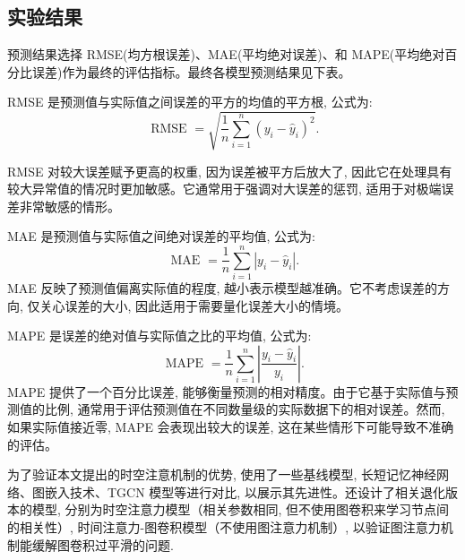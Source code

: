 \subsection{实验结果}


预测结果选择 RMSE(均方根误差)、MAE(平均绝对误差)、和 MAPE(平均绝对百分比误差)作为最终的评估指标。最终各模型预测结果见下表。

RMSE 是预测值与实际值之间误差的平方的均值的平方根, 公式为:
\begin{equation}
\text{ RMSE } = \sqrt{\frac{1}{{n}}\mathop{\sum }\limits_{{{i} = 1}}^{{n}}{\left( {{y}}_{{i}} - {\widehat{{y}}}_{{i}}\right) }^{2}}.
\end{equation}

RMSE 对较大误差赋予更高的权重, 因为误差被平方后放大了, 因此它在处理具有较大异常值的情况时更加敏感。它通常用于强调对大误差的惩罚, 适用于对极端误差非常敏感的情形。

MAE 是预测值与实际值之间绝对误差的平均值, 公式为:
\begin{equation}
\text{ MAE } = \frac{1}{{n}}\mathop{\sum }\limits_{{{i} = 1}}^{{n}}\left| {{{y}}_{{i}} - {\widehat{{y}}}_{{i}}}\right|.
\end{equation}
MAE 反映了预测值偏离实际值的程度, 越小表示模型越准确。它不考虑误差的方向, 仅关心误差的大小, 因此适用于需要量化误差大小的情境。

MAPE 是误差的绝对值与实际值之比的平均值, 公式为:
\begin{equation}
\text{ MAPE } = \frac{1}{{n}}\mathop{\sum }\limits_{{{i} = 1}}^{{n}}\left| \frac{{{y}}_{{i}} - {\widehat{{y}}}_{{i}}}{{{y}}_{{i}}}\right|.
\end{equation}
MAPE 提供了一个百分比误差, 能够衡量预测的相对精度。由于它基于实际值与预测值的比例, 通常用于评估预测值在不同数量级的实际数据下的相对误差。然而, 如果实际值接近零, MAPE 会表现出较大的误差, 这在某些情形下可能导致不准确的评估。

为了验证本文提出的时空注意机制的优势, 使用了一些基线模型, 长短记忆神经网络、图嵌入技术、TGCN 模型等进行对比, 以展示其先进性。还设计了相关退化版本的模型, 分别为时空注意力模型（相关参数相同, 但不使用图卷积来学习节点间的相关性）, 时间注意力-图卷积模型（不使用图注意力机制）, 以验证图注意力机制能缓解图卷积过平滑的问题. 

